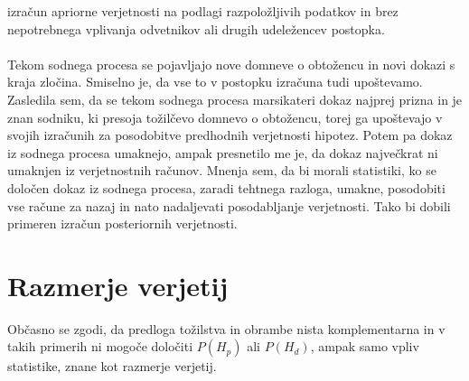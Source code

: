 \documentclass[12pt,a4paper]{amsart}
\theoremstyle{definition} %
\theoremstyle{plain} %
\begin{document}
izračun apriorne verjetnosti na podlagi razpoložljivih podatkov in brez nepotrebnega vplivanja odvetnikov ali drugih udeležencev postopka. \\\\
Tekom sodnega procesa se pojavljajo nove domneve o obtožencu in novi dokazi s kraja zločina. Smiselno je, da vse to v postopku 
izračuna tudi upoštevamo. Zasledila sem, da se tekom sodnega procesa marsikateri dokaz najprej prizna in je znan sodniku, ki presoja tožilčevo domnevo 
o obtožencu, torej ga upoštevajo v svojih izračunih za posodobitve predhodnih verjetnosti hipotez. Potem pa dokaz iz sodnega procesa umaknejo, ampak 
presnetilo me je, da dokaz največkrat ni umaknjen iz verjetnostnih računov. Mnenja sem, da bi morali statistiki, ko se določen dokaz iz 
sodnega procesa, zaradi tehtnega razloga, umakne, posodobiti vse račune za nazaj in nato nadaljevati posodabljanje verjetnosti. Tako bi dobili primeren 
izračun posteriornih verjetnosti.

\section{Razmerje verjetij}
Občasno se zgodi, da predloga tožilstva in obrambe nista komplementarna in v takih primerih ni mogoče določiti $P(H_p)$ ali $P(H_d)$, 
ampak samo vpliv statistike, znane kot razmerje verjetij.

\end{document}
